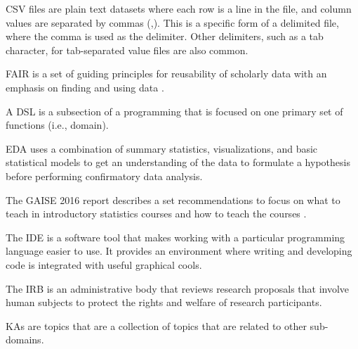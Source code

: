 \documentclass[../main.tex]{subfiles}
\begin{document}


  CSV files are plain text datasets where each row is a line in the file,
  and column values are separated by commas (,).
  This is a specific form of a delimited file, where the comma is used as the delimiter.
  Other delimiters, such as a tab character, for tab-separated value files are also common.



  FAIR is a set of guiding principles for reusability of scholarly data with an emphasis on finding and using data
  \cite{wilkinsonFAIRGuidingPrinciples2016}.



  A DSL is a subsection of a programming that is focused on one primary set of functions (i.e., domain).



  EDA uses a combination of summary statistics, visualizations, and basic statistical models to get an understanding of the data
  to formulate a hypothesis before performing confirmatory data analysis.



  The GAISE 2016 report describes a set recommendations to focus on
  what to teach in introductory statistics courses and
  how to teach the courses
  \cite{gaise2016}.



  The IDE is a software tool that makes working with a particular programming language easier to use.
  It provides an environment where writing and developing code is integrated with useful
  graphical cools.



  The IRB is an administrative body that reviews research proposals that involve human subjects to protect the rights and welfare of
  research participants.



  KAs are topics that are a collection of topics that are related to other sub-domains.

\end{document}
